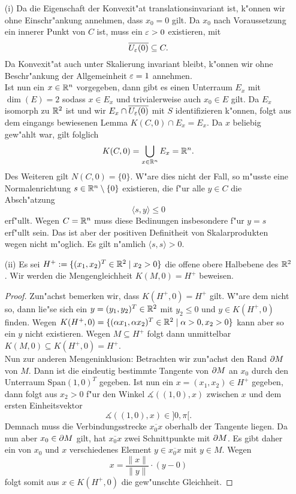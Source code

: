 \begin{itemize}
\item [(i)]
Da die Eigenschaft der Konvexit"at translationsinvariant
ist, k"onnen wir ohne Einschr"ankung annehmen, dass $x_0 = 0$ gilt. Da $x_0$
nach Voraussetzung ein innerer Punkt von $C$ ist, muss ein $\varepsilon > 0$ existieren,
mit
\[
\overline{U_\varepsilon (0)} \subseteq C.
\]
Da Konvexit"at auch unter Skalierung invariant bleibt, k"onnen wir ohne Beschr"ankung
der Allgemeinheit $\varepsilon = 1$ annehmen.\\

Ist nun ein $x\in\mathbb{R}^n$ vorgegeben, dann gibt es einen Unterraum $E_x$ mit $\dim(E)=2$
sodass $x \in E_x$ und trivialerweise auch $x_0 \in E$ gilt. Da $E_x$ isomorph zu $\mathbb{R}^2$
ist und wir $E_x \cap \overline{U_\varepsilon (0)}$ mit $S$ identifizieren k"onnen,
folgt aus dem eingangs bewiesenen Lemma $K(C,0)\cap E_x = E_x$. Da $x$ beliebig
gew"ahlt war, gilt folglich
\[
K(C,0) = \bigcup_{x\in\mathbb{R}^n} E_x = \mathbb{R}^n.
\]
Des Weiteren gilt $N(C,0) = \{0\}$. W"are dies nicht der Fall, so m"usste eine
Normalenrichtung $s\in\mathbb{R}^n\setminus\{0\}$ existieren, die f"ur alle $y\in C$ die Absch"atzung
\[
\langle s, y \rangle \le 0
\]
erf"ullt. Wegen $C = \mathbb{R}^n$ muss diese Bedinungen insbesondere f"ur $y = s$ erf"ullt
sein. Das ist aber der positiven Definitheit von Skalarprodukten wegen nicht m"oglich.
Es gilt n"amlich $\langle s,s \rangle > 0$.

\item[(ii)] Es sei $H^+ := \{(x_1, x_2)^T \in\mathbb{R}^2 \mid x_2 > 0\}$ die offene obere Halbebene
des $\mathbb{R}^2$. Wir werden die Mengengleichheit $K(M,0) = H^+$ beweisen.
\begin{proof}
Zun"achst bemerken wir, dass $K(H^+, 0) = H^+$ gilt. W"are dem nicht so, dann
lie"se sich ein $y = (y_1, y_2)^T \in \mathbb{R}^2$ mit $y_2 \le 0$ und $y\in K(H^+,0)$
finden. Wegen $K(H^+,0) = \{(\alpha x_1, \alpha x_2)^T \in \mathbb{R}^2 \mid \alpha > 0, x_2 > 0\}$ kann aber
so ein $y$ nicht existieren. Wegen $M\subseteq H^+$ folgt dann unmittelbar
$K(M, 0) \subseteq K(H^+, 0) = H^+$.\\

Nun zur anderen Mengeninklusion: Betrachten wir zun"achst den Rand $\partial{M}$
von $M$. Dann ist die eindeutig bestimmte Tangente von $\partial{M}$ an $x_0$ durch den
Unterraum $\text{Span}{(1,0)^T}$ gegeben. Ist nun ein $x=(x_1, x_2)\in H^+$ gegeben,
dann folgt aus $x_2 > 0$ f"ur den Winkel $\measuredangle((1,0),x)$ zwischen $x$
und dem ersten Einheitsvektor
\[
\measuredangle((1,0),x) \in ]0,\pi[.
\]
Demnach
muss die Verbindungsstrecke $\overline {x_0 x}$ oberhalb der Tangente liegen.
Da nun aber $x_0 \in \partial{M}$ gilt, hat $\overline {x_0 x}$ zwei Schnittpunkte mit $\partial{M}$. Es gibt
daher ein von $x_0$ und $x$ verschiedenes Element $y \in \overline {x_0 x}$ mit
$y\in M$. Wegen
\[
x = \frac{\|x\|}{\|y\|}\cdot(y - 0)
\]
folgt somit aus $x\in K(H^+,0)$ die gew"unschte Gleichheit.
\end{proof}


\end{itemize}
